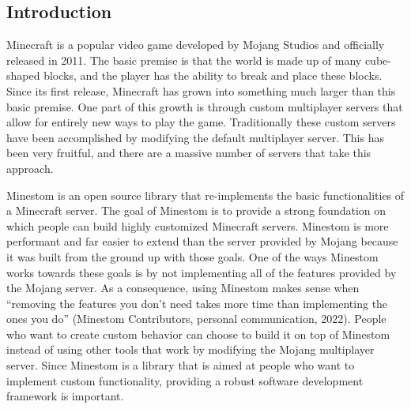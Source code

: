\documentclass{article}
\begin{document}
\newpage %
\begin{onehalfspacing} %

\onehalfspacing
{} %
\setcounter{page}{1} %

\section{Introduction} %

Minecraft is a popular video game developed by Mojang Studios and
officially released in 2011. The basic premise is that the world is made
up of many cube-shaped blocks, and the player has the ability to break
and place these blocks. Since its first release, Minecraft has grown
into something much larger than this basic premise. One part of this
growth is through custom multiplayer servers that allow for entirely new
ways to play the game. Traditionally these custom servers have been
accomplished by modifying the default multiplayer server. This has been
very fruitful, and there are a massive number of servers that take this
approach.

Minestom is an open source library that re-implements the basic
functionalities of a Minecraft server. The goal of Minestom is to
provide a strong foundation on which people can build highly customized
Minecraft servers. Minestom is more performant and far easier to extend
than the server provided by Mojang because it was built from the ground
up with those goals. One of the ways Minestom works towards these goals
is by not implementing all of the features provided by the Mojang
server. As a consequence, using Minestom makes sense when ``removing the
features you don't need takes more time than implementing the ones you
do'' (Minestom Contributors, personal communication, 2022). People who
want to create custom behavior can choose to build it on top of Minestom
instead of using other tools that work by modifying the Mojang
multiplayer server. Since Minestom is a library that is aimed at people
who want to implement custom functionality, providing a robust software
development framework is important.


\end{onehalfspacing}
\end{document}
